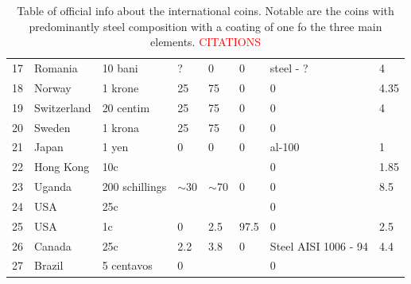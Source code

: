 \documentclass[11pt,a4paper,twoside,onecolumn]{article}
\newcommand{\reminder}[1]{\textcolor{red}{#1}}
\begin{document}
\begin{table}[htbp]
\begin{tabular}{@{}llllllll@{}}
    17             & Romania        & 10 bani        & ?        & 0        & 0      & steel - ?            & 4          \\
    18             & Norway         & 1 krone        & 25       & 75       & 0      & 0                    & 4.35       \\
    19             & Switzerland    & 20 centim      & 25       & 75       & 0      & 0                    & 4          \\
    20             & Sweden         & 1 krona        & 25       & 75       & 0      & 0                    &            \\
    21             & Japan          & 1 yen          & 0        & 0        & 0      & al-100               & 1          \\
    22             & Hong Kong      & 10c            &          &          &        & 0                    & 1.85       \\
    23             & Uganda         & 200 schillings & $\sim$30 & $\sim$70 & 0      & 0                    & 8.5        \\
    24             & USA            & 25c            &          &          &        & 0                    &            \\
    25             & USA            & 1c             & 0        & 2.5      & 97.5   & 0                    & 2.5        \\
    26             & Canada         & 25c            & 2.2      & 3.8      & 0      & Steel AISI 1006 - 94 & 4.4        \\
    27             & Brazil         & 5 centavos     & 0        &          &        & 0                    &            \\ \bottomrule
    \end{tabular}
    \caption{Table of official info about the international coins. Notable are the coins with predominantly steel composition with a coating of one fo the three main elements. \reminder{CITATIONS}}
    \label{tab:coins-official}
\end{table}
\end{document}
